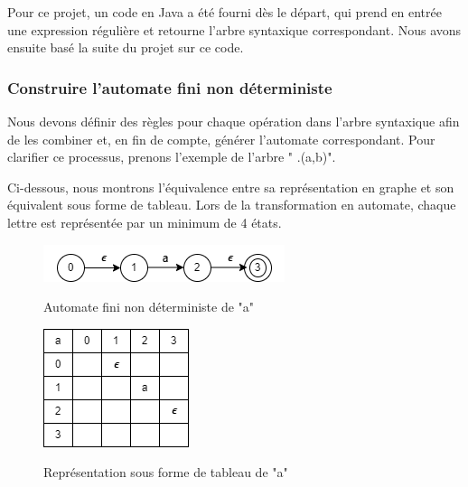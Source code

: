 \documentclass{article}
\begin{document}
Pour ce projet, un code en Java a été fourni dès le départ, qui prend en entrée une expression régulière et retourne l'arbre syntaxique correspondant. Nous avons ensuite basé la suite du projet sur ce code.
\subsubsection{Construire l’automate fini non déterministe}
Nous devons définir des règles pour chaque opération dans l'arbre syntaxique afin de les combiner et, en fin de compte, générer l'automate correspondant. Pour clarifier ce processus, prenons l'exemple de l'arbre " .(a,b)".

Ci-dessous, nous montrons l'équivalence entre sa représentation en graphe et son équivalent sous forme de tableau. Lors de la transformation en automate, chaque lettre est représentée par un minimum de 4 états.

\begin{figure}[h]
    \begin{minipage}{0.3\textwidth}
        \centering
        \includegraphics[width=\textwidth]{ressources/NDFA_a.png}
        \caption{Automate fini non déterministe de "a"}
        \label{fig:ndfa_a}
        \cite{ndfa_a}
    \end{minipage}
    \hspace{5cm} %
    \begin{minipage}{0.25\textwidth}
        \centering
        \includegraphics[width=\textwidth]{ressources/NDFA_a.tab.png}
        \caption{Représentation sous forme de tableau de "a"}
        \label{fig:ndfa_tab_a}
        \cite{ndfa_tab_a}
    \end{minipage}
\end{figure}
\end{document}
